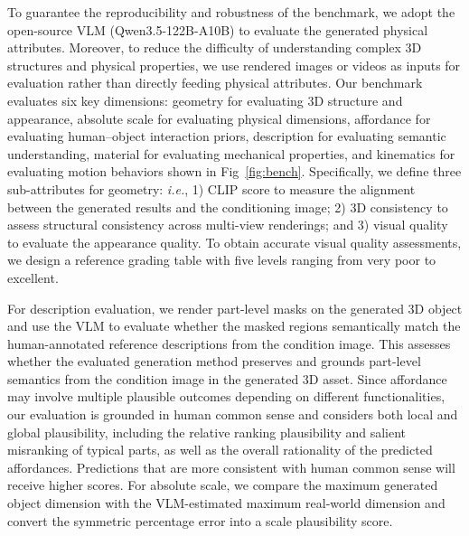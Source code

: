 \documentclass[11pt]{article}
\begin{document}
To guarantee the reproducibility and robustness of the benchmark, we adopt the open-source VLM (Qwen3.5-122B-A10B) to evaluate the generated physical attributes. Moreover, to reduce the difficulty of understanding complex 3D structures and physical properties, we use rendered images or videos as inputs for evaluation rather than directly feeding physical attributes. Our benchmark evaluates six key dimensions: geometry for evaluating 3D structure and appearance, absolute scale for evaluating physical dimensions, affordance for evaluating human–object interaction priors, description for evaluating semantic understanding, material for evaluating mechanical properties, and kinematics for evaluating motion behaviors shown in Fig~\ref{fig:bench}. Specifically, we define three sub-attributes for geometry: \textit{i.e.}, 1) CLIP score to measure the alignment between the generated results and the conditioning image; 2) 3D consistency to assess structural consistency across multi-view renderings; and 3) visual quality to evaluate the appearance quality. To obtain accurate visual quality assessments, we design a reference grading table with five levels ranging from very poor to excellent.

For description evaluation, we render part-level masks on the generated 3D object and use the VLM to evaluate whether the masked regions semantically match the human-annotated reference descriptions from the condition image.
This assesses whether the evaluated generation method preserves and grounds part-level semantics from the condition image in the generated 3D asset.
Since affordance may involve multiple plausible outcomes depending on different functionalities, our evaluation is grounded in human common sense and considers both local and global plausibility, including the relative ranking plausibility and salient misranking of typical parts, as well as the overall rationality of the predicted affordances. Predictions that are more consistent with human common sense will receive higher scores. 
For absolute scale, we compare the maximum generated object dimension with the VLM-estimated maximum real-world dimension and convert the symmetric percentage error into a scale plausibility score.
\end{document}
